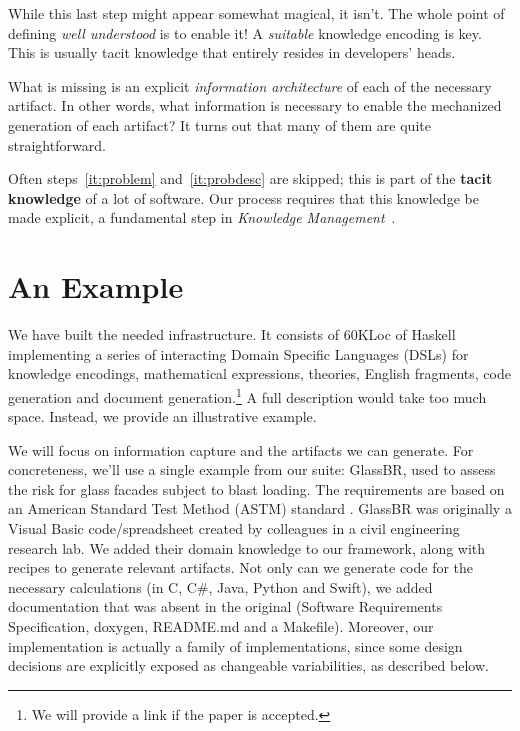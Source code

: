 \documentclass[sigconf,review,anonymous=false]{acmart}
\newcommand{\CC}{C\nolinebreak\hspace{-.05em}\raisebox{.4ex}{\small\bf +}\nolinebreak\hspace{-.10em}\raisebox{.4ex}{\small\bf +}}
\begin{document}
While this last step might appear somewhat magical, it isn't. The whole point of
defining \emph{well understood} is to enable it! A \emph{suitable}
knowledge encoding is key. This is usually tacit knowledge that
entirely resides in developers' heads.

What is missing is an explicit \emph{information architecture} of each of
the necessary artifact. In other words, what information is necessary to
enable the mechanized generation of each artifact? It turns out that many
of them are quite straightforward.

Often steps~\ref{it:problem} and~\ref{it:probdesc} are skipped; this is
part of the \textbf{tacit knowledge} of a lot
of software.  Our process requires that this knowledge be made explicit,
a fundamental step in \emph{Knowledge Management}~\cite{Dalkir2011}.


\section{An Example}\label{ch:example}

We have built the needed infrastructure. It consists of 60KLoc of Haskell
implementing a series of interacting Domain Specific Languages (DSLs) for
knowledge encodings, mathematical expressions, theories, English fragments,
code generation and document generation.\footnote{We will provide a link
if the paper is accepted.} A full description would take too much space.
Instead, we provide an illustrative example.

We will focus on information capture and the artifacts we can generate. For
concreteness, we'll use a single example from our suite: GlassBR, used to
assess the risk for glass facades subject to blast loading.
The requirements are based on an American Standard Test Method (ASTM) standard
\cite{BeasonEtAl1998, ASTM2009, ASTM2015}. GlassBR was originally a Visual
Basic code/spreadsheet created by colleagues in a civil engineering research
lab.  We added their domain knowledge to our framework, along with recipes to
generate relevant artifacts.  Not only can we generate code for the necessary
calculations (in \CC, C\#, Java, Python and Swift), we added documentation that
was absent in the original (Software Requirements Specification, doxygen, README.md
and a Makefile). Moreover, our implementation is actually a family of
implementations, since some design decisions are explicitly exposed as
changeable variabilities, as described below.
\end{document}
